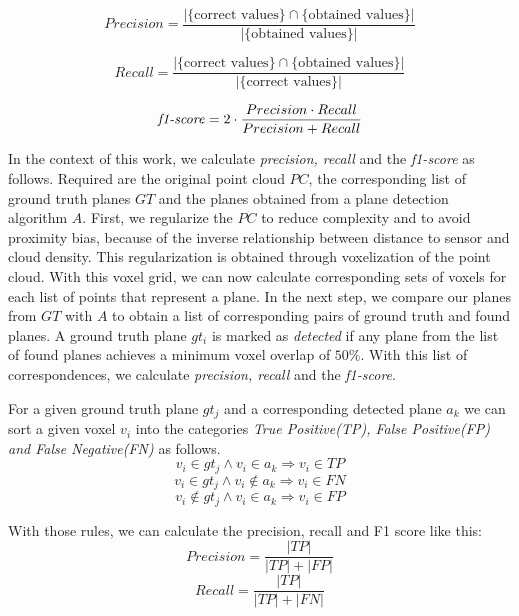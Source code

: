 \documentclass[main.tex]{subfiles}
\begin{document}
\begin{equation}
    Precision = \frac{|\{\text{correct values}\} \cap \{\text{obtained values}\}|}{|\{\text{obtained values}\}|}
    \label{eq:prec}
\end{equation}

\begin{equation}
    Recall = \frac{|\{\text{correct values}\} \cap \{\text{obtained values}\}|}{|\{\text{correct values}\}|}
    \label{eq:rec}
\end{equation}

\begin{equation}
    \text{\textit{f1-score}} = 2 \cdot\frac{Precision\cdot Recall}{Precision + Recall}
    \label{eq:f1}
\end{equation}



In the context of this work, we calculate \textit{precision, recall} and the \textit{f1-score} as follows.
Required are the original point cloud $PC$, the corresponding list of ground truth planes $GT$ and the planes obtained from a plane detection algorithm $A$.
First, we regularize the $PC$ to reduce complexity and to avoid proximity bias, because of the inverse relationship
between distance to sensor and cloud density. This regularization is obtained through voxelization of the point cloud.
With this voxel grid, we can now calculate corresponding sets of voxels for each list of points that represent a plane.
In the next step, we compare our planes from $GT$ with $A$ to obtain a list of corresponding pairs of ground truth and found planes.
A ground truth plane $gt_i$ is marked as \textit{detected} if any plane from the list of found planes achieves a minimum voxel overlap of $50\%$.
With this list of correspondences, we calculate \textit{precision, recall} and the \textit{f1-score}.

For a given ground truth plane $gt_j$ and a corresponding detected plane $a_k$ we can sort a given voxel $v_i$ into the categories
\textit{True Positive(TP), False Positive(FP) and False Negative(FN)} as follows.
$$v_i \in gt_j \land v_i \in a_k \Rightarrow v_{i} \in TP$$
$$v_i \in gt_j \land v_i \notin a_k \Rightarrow v_{i} \in FN$$
$$v_i \notin gt_j \land v_i \in a_k \Rightarrow v_{i} \in FP$$

With those rules, we can calculate the precision, recall and F1 score like this:
$$Precision = \frac{|TP|}{|TP|+|FP|}$$
$$Recall = \frac{|TP|}{|TP|+|FN|}$$
\end{document}
